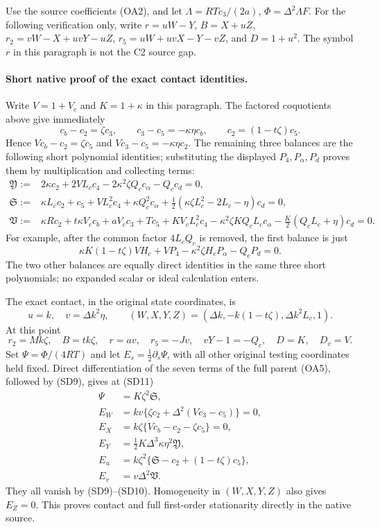 Use the source coefficients (OA2), and let
$\Lambda=RTc_3/(2a)$, $\Phi=\Delta^2\Lambda F$.
For the following verification only, write
$r=uW-Y$, $B=X+uZ$, $r_2=vW-X+uvY-uZ$,
$r_5=uW+uvX-Y-vZ$, and $D=1+u^2$.
The symbol $r$ in this paragraph is not the C2 source gap.
\paragraph{Short native proof of the exact contact identities.}
Write $V=1+V_c$ and $K=1+\kappa$ in this paragraph. The factored
coquotients above give immediately
\[
 c_b-c_2=\zeta c_3,\qquad c_3-c_5=-\kappa\eta c_b,
 \qquad c_2=(1-t\zeta)c_5.                            \tag{SD9}
\]
Hence $Vc_b-c_2=\zeta c_5$ and
$Vc_3-c_5=-\kappa\eta c_2$.
The remaining three balances are the following short polynomial
identities; substituting the displayed $P_4,P_\alpha,P_d$ proves them
by multiplication and collecting terms:
\begin{align*}
\mathfrak Y:={}&2\kappa c_2+2VL_cc_4
                 -2\kappa^2\zeta Q_cc_\alpha-Q_cc_d=0,\\
\mathfrak S:={}&\kappa L_cc_2+c_5+VL_c^2c_4+\kappa Q_c^2c_\alpha
                 +\tfrac12(\kappa\zeta L_c^2-2L_c-\eta)c_d=0,\\
\mathfrak V:={}&\kappa Rc_2+t\kappa V_cc_b+aV_cc_3+Tc_5
 +KV_cL_c^2c_4-\kappa^2\zeta KQ_cL_cc_\alpha
 -\tfrac K2(Q_cL_c+\eta)c_d=0.                        \tag{SD10}
\end{align*}
For example, after the common factor $4L_cQ_c$ is removed,
the first balance is just
\[
 \kappa K(1-t\zeta)VH_c+VP_4
       -\kappa^2\zeta H_cP_\alpha-Q_cP_d=0.
\]
The two other balances are equally direct identities in the same three
short polynomials; no expanded scalar or ideal calculation enters.

The exact contact, in the original state coordinates, is
\[
 u=k,\quad v=\Delta k^2\eta,\qquad
 (W,X,Y,Z)=(\Delta k,-k(1-t\zeta),\Delta k^2L_c,1).      \tag{SD11}
\]
At this point
\[
 r_2=Mk\zeta,\quad B=tk\zeta,\quad r=av,\quad
 r_5=-Jv,\quad vY-1=-Q_c,\quad D=K,\quad D_v=V.
\]
Set $\Psi=\Phi/(4RT)$ and let $E_s=\tfrac12\partial_s\Psi$,
with all other original testing coordinates held fixed.
Direct differentiation of the seven terms of the full parent (OA5), followed by (SD9),
gives at (SD11)
\begin{align*}
 \Psi&=K\zeta^2\mathfrak S,\\
 E_W&=kv\{\zeta c_2+\Delta^2(Vc_3-c_5)\}=0,\\
 E_X&=k\zeta\{Vc_b-c_2-\zeta c_5\}=0,\\
 E_Y&=\tfrac12K\Delta^3\kappa\eta^2\mathfrak Y,\\
 E_u&=k\zeta^2\{\mathfrak S-c_2+(1-t\zeta)c_5\},\\
 E_v&=v\Delta^2\mathfrak V.
\end{align*}
They all vanish by (SD9)--(SD10). Homogeneity in $(W,X,Y,Z)$ also gives
$E_Z=0$. This proves contact and full first-order stationarity directly
in the native source.
